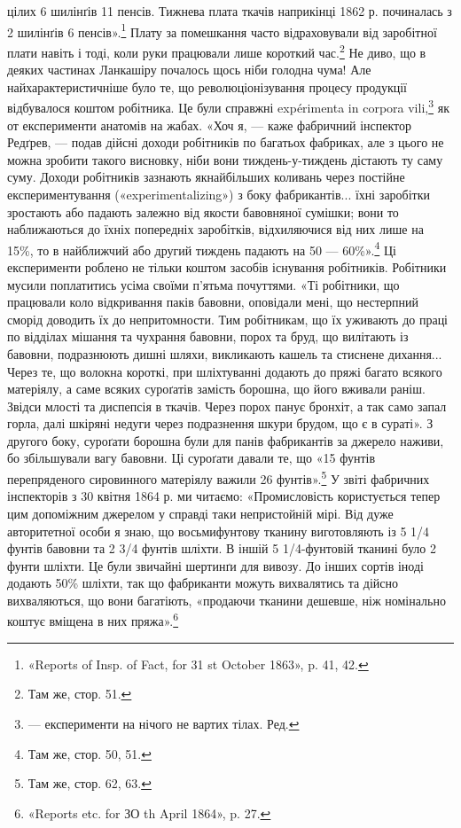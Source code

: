 \parcont{}  %
цілих 6 шилінґів 11 пенсів. Тижнева плата ткачів наприкінці
1862 р. починалась з 2 шилінґів 6 пенсів».\footnote{
«Reports of Insp. of Fact, for 31 st October 1863», p. 41, 42.
} Плату за помешкання
часто відраховували від заробітної плати навіть і тоді, коли
руки працювали лише короткий час.\footnote{
Там же, стор. 51.
} Не диво, що в деяких
частинах Ланкашіру почалось щось ніби голодна чума! Але найхарактеристичніше
було те, що революціонізування процесу продукції
відбувалося коштом робітника. Це були справжні expérimenta
in corpora vili,\footnote*{
— експерименти на нічого не вартих тілах. Ред.
} як от експерименти анатомів на жабах.
«Хоч я, — каже фабричний інспектор Редґрев, — подав дійсні
доходи робітників по багатьох фабриках, але з цього не можна
зробити такого висновку, ніби вони тиждень-у-тиждень дістають
ту саму суму. Доходи робітників зазнають якнайбільших
коливань через постійне експериментування («experimentalizing»)
з боку фабрикантів... їхні заробітки зростають або падають залежно
від якости бавовняної сумішки; вони то наближаються
до їхніх попередніх заробітків, відхиляючися від них лише на
15\%, то в найближчий або другий тиждень падають на 50 —
60\%».\footnote{
Там же, стор. 50, 51.
} Ці експерименти роблено не тільки коштом засобів
існування робітників. Робітники мусили поплатитись усіма своїми
п’ятьма почуттями. «Ті робітники, що працювали коло відкривання
паків бавовни, оповідали мені, що нестерпний сморід
доводить їх до непритомности. Тим робітникам, що їх уживають
до праці по відділах мішання та чухрання бавовни, порох та бруд,
що вилітають із бавовни, подразнюють дишні шляхи, викликають
кашель та стиснене дихання... Через те, що волокна короткі,
при шліхтуванні додають до пряжі багато всякого матеріялу, а
саме всяких суроґатів замість борошна, що його вживали раніш.
Звідси млості та диспепсія в ткачів. Через порох панує бронхіт,
а так само запал горла, далі шкіряні недуги через подразнення
шкури брудом, що є в сураті». З другого боку, суроґати борошна
були для панів фабрикантів за джерело наживи, бо збільшували
вагу бавовни. Ці суроґати давали те, що «15 фунтів перепряденого
сировинного матеріялу важили 26 фунтів».\footnote{
Там же, стор. 62, 63.
} У звіті фабричних
інспекторів з 30 квітня 1864 р. ми читаємо: «Промисловість
користується тепер цим допоміжним джерелом у справді таки
непристойній мірі. Від дуже авторитетної особи я знаю, що восьмифунтову
тканину виготовляють із 5 1/4 фунтів бавовни та 2 3/4 фунтів
шліхти. В іншій 5 1/4-фунтовій тканині було 2 фунти шліхти.
Це були звичайні шертинґи для вивозу. До інших сортів іноді
додають 50\% шліхти, так що фабриканти можуть вихвалятись
та дійсно вихваляються, що вони багатіють, «продаючи тканини
дешевше, ніж номінально коштує вміщена в них пряжа».\footnote{
«Reports etc. for ЗО th April 1864», p. 27.
}
\parbreak{}  %
